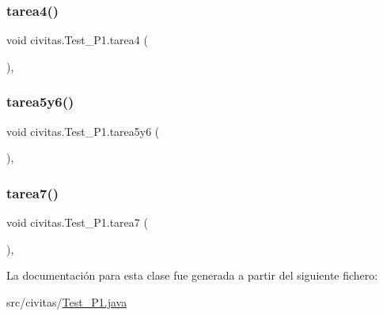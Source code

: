 \subsubsection{\texorpdfstring{tarea4()}{tarea4()}}
{\footnotesize\ttfamily void civitas.\+Test\+\_\+\+P1.\+tarea4 (\begin{DoxyParamCaption}{ }\end{DoxyParamCaption})\hspace{0.3cm}{\ttfamily [inline]}, {\ttfamily [package]}}

\mbox{\label{classcivitas_1_1Test__P1_a2b9689ba61a45af4c82cfafa38834d8a}} 
\subsubsection{\texorpdfstring{tarea5y6()}{tarea5y6()}}
{\footnotesize\ttfamily void civitas.\+Test\+\_\+\+P1.\+tarea5y6 (\begin{DoxyParamCaption}{ }\end{DoxyParamCaption})\hspace{0.3cm}{\ttfamily [inline]}, {\ttfamily [package]}}

\mbox{\label{classcivitas_1_1Test__P1_a26a524f5c0aa206cd9f9c154bc39454b}} 
\subsubsection{\texorpdfstring{tarea7()}{tarea7()}}
{\footnotesize\ttfamily void civitas.\+Test\+\_\+\+P1.\+tarea7 (\begin{DoxyParamCaption}{ }\end{DoxyParamCaption})\hspace{0.3cm}{\ttfamily [inline]}, {\ttfamily [package]}}



La documentación para esta clase fue generada a partir del siguiente fichero\+:\begin{DoxyCompactItemize}
\item 
src/civitas/\hyperlink{Test__P1_8java}{Test\+\_\+\+P1.\+java}\end{DoxyCompactItemize}
